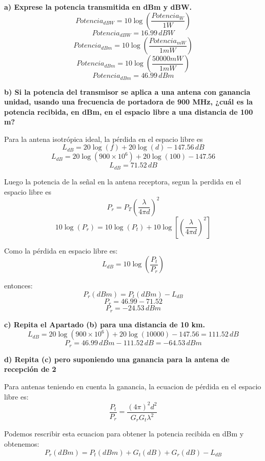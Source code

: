 \documentclass[11pt,a4paper]{article}
\begin{document}
\begin{enumerate}[label=4.\arabic*), itemsep=0.3cm]
        \textbf{a) Exprese la potencia transmitida en dBm y dBW.}
        $$
          Potencia_{dBW}=10\log\left(\frac{Potencia_W}{1W}\right)
        $$
        $$
          \boxed{
            Potencia_{dBW}=16.99\,dBW
          }
        $$
        $$
          Potencia_{dBm}=10\log\left(\frac{Potencia_{mW}}{1mW}\right)
        $$
        $$
          Potencia_{dBm}=10\log\left(\frac{50000mW}{1mW}\right)
        $$
        $$
          \boxed{Potencia_{dBm}=46.99\,dBm}
        $$

        \textbf{b) Si la potencia del transmisor se aplica a una antena con ganancia unidad, usando una frecuencia de portadora de 900 MHz, ¿cuál es la potencia recibida, en dBm, en el espacio libre a una distancia de 100 m?}

        Para la antena isotrópica ideal, la pérdida en el espacio libre es
        $$
          L_{dB}=20\log(f)+20\log(d)-147.56\,dB
        $$
        $$
          L_{dB}=20\log(900\times10^6)+20\log(100)-147.56
        $$
        $$
          \boxed{L_{dB}=71.52\,dB}
        $$

        Luego la potencia de la señal en la antena receptora, segun la perdida en el espacio libre es
        $$
          P_r=P_T\left(\frac{\lambda}{4\pi d}\right)^2
        $$
        $$
          10\log(P_r)=10\log(P_t) +10\log\left[  \left(\frac{\lambda}{4\pi d}\right)^2\right]
        $$

        Como la pérdida en espacio libre es:
        $$
          L_{dB}=10\log\left(\frac{P_t}{P_r}\right)
        $$

        entonces:
        $$
          P_r(dBm)=P_t(dBm)-L_{dB}
        $$
        $$
          P_r=46.99-71.52
        $$
        $$
          \boxed{P_r=-24.53\,dBm}
        $$

        \textbf{c) Repita el Apartado (b) para una distancia de 10 km.}
        $$
          L_{dB}=20\log(900\times10^6)+20\log(10000)-147.56=111.52\,dB
        $$
        $$
          \boxed{P_r=46.99\,dBm-111.52\,dB=-64.53\,dBm}
        $$

        \textbf{d) Repita (c) pero suponiendo una ganancia para la antena de recepción de 2}

        Para antenas teniendo en cuenta la ganancia, la ecuacion de pérdida en el espacio libre es:
        $$
          \frac{P_t}{P_r}=\frac{(4\pi)^2d^2}{G_rG_t\lambda^2}
        $$

        Podemos rescribir esta ecuacion para obtener la potencia recibida en dBm y obtenemos:
        $$
          P_r(dBm)=P_t(dBm)+G_t(dB)+G_r(dB)-L_{dB}
        $$


\end{enumerate}
\end{document}
